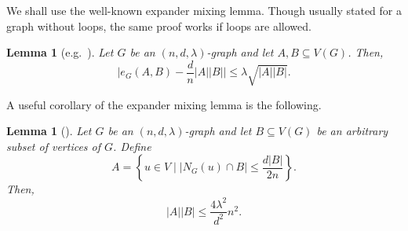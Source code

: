 \documentclass{article}
\theoremstyle{plain}
\newtheorem{lemma}[theorem]{Lemma}
\theoremstyle{definition}
\begin{document}
We shall use the well-known expander mixing lemma. Though usually stated for a graph without loops, the same proof works if loops are allowed.
\begin{lemma}[e.g.~{\cite[Corollary~9.2.5]{alon-spencer}}] \label{lem:expander-mixing}
    Let $G$ be an $(n, d, \lambda)$-graph and let $A, B \subseteq V(G)$. Then,
    \[ \big| e_G(A, B) - \frac{d}{n} |A||B| \big| \le \lambda \sqrt{|A||B|} . \]
\end{lemma}

A useful corollary of the expander mixing lemma is the following.
\begin{lemma}[{\cite[Lemma~2.2]{alon-rodl}}] \label{lem:BC}
    Let $G$ be an $(n, d, \lambda)$-graph and let $B \subseteq V(G)$ be an arbitrary subset of vertices of $G$. Define
    \[ A = \left\{ u \in V \mid |N_G(u) \cap B| \le \frac{d|B|}{2n} \right\}. \]
    Then,
    \[ |A| |B| \le \frac{4 \lambda^2}{d^2} n^2. \]
\end{lemma}
\end{document}
